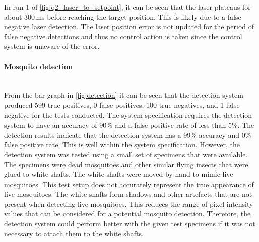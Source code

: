In run 1 of \autoref{fig:q2_laser_to_setpoint}, it can be seen that the laser plateaus for about 300\,ms before reaching the target position. This is likely due to a false negative laser detection. The laser position error is not updated for the period of false negative detections and thus no control action is taken since the control system is unaware of the error.


\paragraph{Mosquito detection}\hfill\\
From the bar graph in \autoref{fig:detection} it can be seen that the detection system produced 599 true positives, 0 false positives, 100 true negatives, and 1 false negative for the tests conducted. The system specification requires the detection system to have an accuracy of 90\% and a false positive rate of less than 5\%. The detection results indicate that the detection system has a 99\% accuracy and 0\% false positive rate. This is well within the system specification. However, the detection system was tested using a small set of specimens that were available. The specimens were dead mosquitoes and other similar flying insects that were glued to white shafts. The white shafts were moved by hand to mimic live mosquitoes. This test setup does not accurately represent the true appearance of live mosquitoes. The white shafts form shadows and other artefacts that are not present when detecting live mosquitoes. This reduces the range of pixel intensity values that can be considered for a potential mosquito detection. Therefore, the detection system could perform better with the given test specimens if it was not necessary to attach them to the white shafts.

